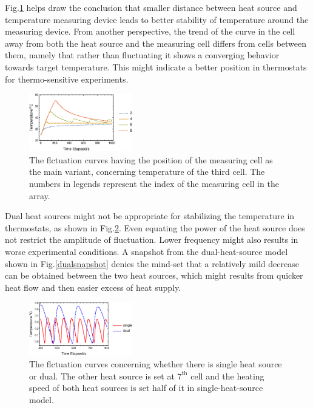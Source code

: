 \documentclass[%
 reprint,
 amsmath,amssymb,
 aps,
]{revtex4-1}
\begin{document}
Fig.\ref{tempdetect} helps draw the conclusion that smaller distance between heat source and temperature measuring device leads to better stability of temperature around the measuring device. From another perspective, the trend of the curve in the cell away from both the heat source and the measuring cell differs from cells between them, namely that rather than fluctuating it shows a converging behavior towards target temperature. This might indicate a better position in thermostats for thermo-sensitive experiments.

\begin{figure}
\centering
\includegraphics[width=0.4\textwidth]{figures/tempdetect.eps}
\caption{The flctuation curves having the position of the measuring cell as the main variant, concerning temperature of the third cell. The numbers in legends represent the index of the measuring cell in the array.}
\label{tempdetect}
\end{figure}

Dual heat sources might not be appropriate for stabilizing the temperature in thermostats, as shown in Fig.\ref{singledual}. Even equating the power of the heat source does not restrict the amplitude of fluctuation. Lower frequency might also results in worse experimental conditions. A snapshot from the dual-heat-source model shown in Fig.\ref{dualsnapshot} denies the mind-set that a relatively mild decrease can be obtained between the two heat sources, which might results from quicker heat flow and then easier excess of heat supply.

\begin{figure}
\centering
\includegraphics[width=0.4\textwidth]{figures/singledualcomp.eps}
\caption{The flctuation curves concerning whether there is single heat source or dual. The other heat source is set at $7^\text{th}$ cell and the heating speed of both heat sources is set half of it in single-heat-source model.}
\label{singledual}
\end{figure}
\end{document}
